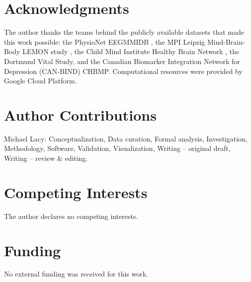 \documentclass[11pt,a4paper]{article}
\begin{document}
\section*{Acknowledgments}

The author thanks the teams behind the publicly available datasets that made this work possible: the PhysioNet EEGMMIDB \parencite{goldberger2000physiobank}, the MPI Leipzig Mind-Brain-Body LEMON study \parencite{babayan2019lemon}, the Child Mind Institute Healthy Brain Network \parencite{alexander2017hbn}, the Dortmund Vital Study, and the Canadian Biomarker Integration Network for Depression (CAN-BIND) CHBMP. Computational resources were provided by Google Cloud Platform.

\section*{Author Contributions}

Michael Lacy: Conceptualization, Data curation, Formal analysis, Investigation, Methodology, Software, Validation, Visualization, Writing -- original draft, Writing -- review \& editing.

\section*{Competing Interests}

The author declares no competing interests.

\section*{Funding}

No external funding was received for this work.

\newpage
\printbibliography
\end{document}

